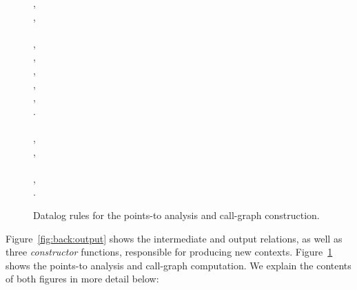 \begin{figure}[tb!p]
\begin{datalog}
, \\
, \\
 \dlIf{} \\
    , \\
    , \\
    ,\\
    , \\
    ,\\
    . \\
\\
, \\
, \\
 \dlIf{} \\
    , \\
    .
\end{datalog}
\caption[Core Datalog rules for the points-to analysis and call-graph construction]{Datalog rules for the points-to analysis and call-graph construction.}
\label{fig:back:baserules}
\end{figure}

Figure~\ref{fig:back:output} shows the intermediate and output relations, as well as three \emph{constructor} functions, responsible for producing new contexts. Figure~\ref{fig:back:baserules} shows the points-to analysis and call-graph computation. We explain the contents of both figures in more detail below:

